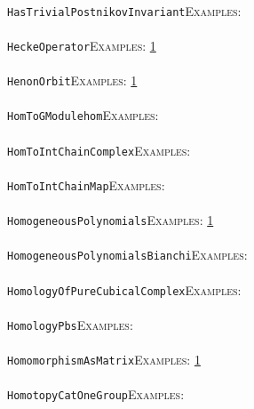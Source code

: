 \documentclass[a4paper,11pt]{report}
\begin{document}
{{ \\
 \texttt{HasTrivialPostnikovInvariant}{\nobreakspace}{\nobreakspace}{\nobreakspace}{\nobreakspace}\textsc{Examples:} \\
 \\
 \texttt{HeckeOperator}{\nobreakspace}{\nobreakspace}{\nobreakspace}{\nobreakspace}\textsc{Examples:} \href{tutorial/chap10.html} {1}{\nobreakspace} \\
 \\
 \texttt{HenonOrbit}{\nobreakspace}{\nobreakspace}{\nobreakspace}{\nobreakspace}\textsc{Examples:} \href{tutorial/chap2.html} {1}{\nobreakspace} \\
 \\
 \texttt{HomToGModule{\textunderscore}hom}{\nobreakspace}{\nobreakspace}{\nobreakspace}{\nobreakspace}\textsc{Examples:} \\
 \\
 \texttt{HomToInt{\textunderscore}ChainComplex}{\nobreakspace}{\nobreakspace}{\nobreakspace}{\nobreakspace}\textsc{Examples:} \\
 \\
 \texttt{HomToInt{\textunderscore}ChainMap}{\nobreakspace}{\nobreakspace}{\nobreakspace}{\nobreakspace}\textsc{Examples:} \\
 \\
 \texttt{HomogeneousPolynomials}{\nobreakspace}{\nobreakspace}{\nobreakspace}{\nobreakspace}\textsc{Examples:} \href{tutorial/chap10.html} {1}{\nobreakspace} \\
 \\
 \texttt{HomogeneousPolynomials{\textunderscore}Bianchi}{\nobreakspace}{\nobreakspace}{\nobreakspace}{\nobreakspace}\textsc{Examples:} \\
 \\
 \texttt{HomologyOfPureCubicalComplex}{\nobreakspace}{\nobreakspace}{\nobreakspace}{\nobreakspace}\textsc{Examples:} \\
 \\
 \texttt{HomologyPbs}{\nobreakspace}{\nobreakspace}{\nobreakspace}{\nobreakspace}\textsc{Examples:} \\
 \\
 \texttt{HomomorphismAsMatrix}{\nobreakspace}{\nobreakspace}{\nobreakspace}{\nobreakspace}\textsc{Examples:} \href{tutorial/chap10.html} {1}{\nobreakspace} \\
 \\
 \texttt{HomotopyCatOneGroup}{\nobreakspace}{\nobreakspace}{\nobreakspace}{\nobreakspace}\textsc{Examples:} \\
 \\
}}
\end{document}
